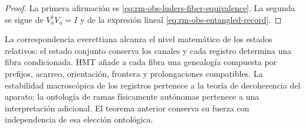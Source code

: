 \begin{proof}
La primera afirmaci\'on es
\cref{eq:rm-obs-luders-fiber-equivalence}. La segunda se sigue de
\(V_a^\dagger V_a=I\) y de la expresi\'on lineal
\cref{eq:rm-obs-entangled-record}.
\end{proof}

La correspondencia everettiana alcanza el nivel matem\'atico de los estados
relativos: el estado conjunto conserva los canales y cada registro determina
una fibra condicionada. HMT a\~nade a cada fibra una genealog\'ia compuesta
por prefijos, acarreo, orientaci\'on, frontera y prolongaciones compatibles.
La estabilidad macrosc\'opica de los registros pertenece a la teor\'ia de
decoherencia del aparato; la ontolog\'ia de ramas f\'isicamente aut\'onomas
pertenece a una interpretaci\'on adicional. El teorema anterior conserva su
fuerza con independencia de esa elecci\'on ontol\'ogica.

